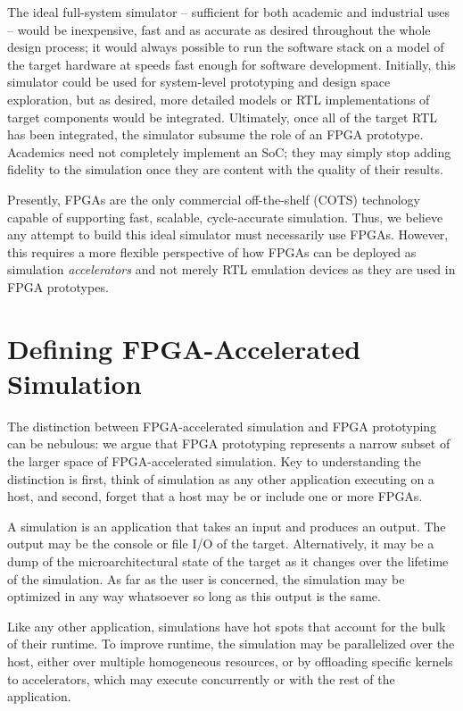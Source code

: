 The ideal full-system simulator -- sufficient for both academic and industrial
uses -- would be inexpensive, fast and as accurate as desired throughout the
whole design process; it would always possible to run the software stack on a
model of the target hardware at speeds fast enough for software development.
Initially, this simulator could be used for system-level prototyping and design
space exploration, but as desired, more detailed models or RTL implementations
of target components would be integrated. Ultimately, once all of the target
RTL has been integrated, the simulator subsume the role of an FPGA prototype.
Academics need not completely implement an SoC; they may simply stop adding
fidelity to the simulation once they are content with the quality of their
results.

Presently, FPGAs are the only commercial off-the-shelf (COTS) technology
capable of supporting fast, scalable, cycle-accurate simulation. Thus, we
believe any attempt to build this ideal simulator must necessarily use FPGAs.
However, this requires a more flexible perspective of how FPGAs can be deployed as
simulation \emph{accelerators} and not merely RTL emulation devices as they are
used in FPGA prototypes.

\section{Defining FPGA-Accelerated Simulation}

The distinction between FPGA-accelerated simulation and FPGA prototyping can be
nebulous: we argue that FPGA prototyping represents a narrow subset of the larger
space of FPGA-accelerated simulation. Key to understanding the distinction is
first, think of simulation as any other application executing on a host, and
second, forget that a host may be or include one or more FPGAs.

A simulation is an application that takes an input and produces an output.  The
output may be the console or file I/O of the target.  Alternatively, it may be
a dump of the microarchitectural state of the target as it changes over the
lifetime of the simulation.  As far as the user is concerned, the simulation
may be optimized in any way whatsoever so long as this output is the same.

Like any other application, simulations have hot spots that account for the bulk
of their runtime. To improve runtime, the simulation may be parallelized over
the host, either over multiple homogeneous resources, or by offloading specific
kernels to accelerators, which may execute concurrently or with the rest
of the application.

